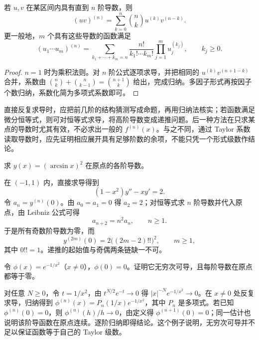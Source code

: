 \begin{theorem}[Leibniz 公式]
\label{thm:pei-diff-leibniz}
若 $u,v$ 在某区间内具有直到 $n$ 阶导数，则
\begin{equation}
 (uv)^{(n)}=\sum_{k=0}^n\binom nk u^{(k)}v^{(n-k)}.
 \label{eq:pei-diff-leibniz}
\end{equation}
更一般地，$m$ 个具有这些导数的函数满足
\[
 (u_1\cdots u_m)^{(n)}
 =\sum_{k_1+\cdots+k_m=n}
 \frac{n!}{k_1!\cdots k_m!}\prod_{j=1}^m u_j^{(k_j)},
 \qquad k_j\ge0.
\]
\end{theorem}
\begin{proof}
$n=1$ 时为乘积法则。对 $n$ 阶公式逐项求导，并把相同的 $u^{(k)}v^{(n+1-k)}$ 合并，系数由
$\binom nk+\binom n{k-1}=\binom{n+1}k$ 给出，完成归纳。多因子形式再按因子个数归纳，系数化简为多项式系数即可。
\end{proof}

直接反复求导时，应把前几阶的结构猜测写成命题，再用归纳法核实；若函数满足微分恒等式，则可对恒等式求导，将高阶导数变成递推问题。后一种方法在只求某点的导数时尤其有效，不必求出一般的 $f^{(n)}(x)$。与之不同，通过 Taylor 系数读取导数时，应先证明相应展开具有足够阶数的余项，不能只凭一个形式级数作结论。

\begin{example}
\label{ex:pei-diff-arcsin-recurrence}
求 $y(x)=(\arcsin x)^2$ 在原点的各阶导数。
\end{example}
\begin{solve}
在 $(-1,1)$ 内，直接求导得到
\[
 (1-x^2)y''-xy'=2.
\]
令 $a_n=y^{(n)}(0)$。由 $a_0=a_1=0$ 得 $a_2=2$；对恒等式求 $n$ 阶导数并代入原点，由 Leibniz 公式可得
\[
 a_{n+2}=n^2a_n,\qquad n\ge1.
\]
于是所有奇数阶导数为零，而
\[
 y^{(2m)}(0)=2\bigl((2m-2)!!\bigr)^2,\qquad m\ge1,
\]
其中 $0!!=1$。递推的起始值与奇偶两条链缺一不可。
\end{solve}

\begin{example}
\label{ex:pei-diff-flat-function}
令 $\phi(x)=e^{-1/x^2}$（$x\ne0$），$\phi(0)=0$。证明它无穷次可导，且每阶导数在原点都等于零。
\end{example}
\begin{solve}
对任意 $N\ge0$，令 $t=1/x^2$，由 $t^{N/2}e^{-t}\to0$ 得
$|x|^{-N}e^{-1/x^2}\to0$。在 $x\ne0$ 处反复求导，归纳得到 $\phi^{(n)}(x)=P_n(1/x)e^{-1/x^2}$，其中 $P_n$ 是多项式。若已知 $\phi^{(n)}(0)=0$，则 $\phi^{(n)}(h)/h\to0$，由定义得 $\phi^{(n+1)}(0)=0$；同一估计也说明该阶导函数在原点连续。逐阶归纳即得结论。这个例子说明，无穷次可导并不足以保证函数等于自己的 Taylor 级数。
\end{solve}

